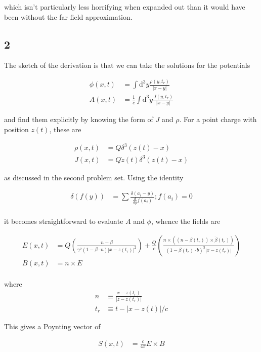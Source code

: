 \documentclass[12pt]{article}
\begin{document}
which isn't particularly less horrifying when expanded out than it would have been without the far field approximation.

\subsection*{2}

The sketch of the derivation is that we can take the solutions for the potentials

\begin{align*}
\phi(x,t) &= \int\mathrm{d}^3y\frac{\rho(y,t_r)}{|x-y|} \\[6pt]
A(x,t) &= \frac{1}{c}\int\mathrm{d}^3y\frac{J(y,t_r)}{|x-y|} 
\end{align*}

and find them explicitly by knowing the form of \(J\) and \(\rho\). For a point charge with position \(z(t)\), these are

\begin{align*}
\rho(x,t) &= Q\delta^3(z(t)-x) \\
J(x,t) &= Q\dot{z}(t)\delta^3(z(t)-x)
\end{align*}

as discussed in the second problem set. Using the identity

\begin{align*}
\delta(f(y)) &= \sum\frac{\delta(a_i-y)}{\frac{d}{dy}f(a_i)};f(a_i) = 0\\  
\end{align*}

it becomes straightforward to evaluate \(A\) and \(\phi\), whence the fields are

\begin{align*}
E(x,t) &= Q\left( \frac{n-\beta}{\gamma^2(1-\beta \cdot n)|x-z(t_r)|^2} \right) +\frac{Q}{c}\left( \frac{n \times( (n-\beta(t_r)) \times \dot{\beta}(t_r))}{(1-\beta(t_r)\cdot b)^3|x-z(t_r)|}\right) \\
%
B(x,t) &= n \times E \\
\end{align*}

where
\begin{align*}
n &\equiv \frac{x-z(t_r)}{|z-z(t_r)|}\\
t_r &\equiv t - |x-z(t)|/c
\end{align*}

This gives a Poynting vector of

\begin{align*}
S(x,t) &= \frac{c}{4\pi}E\times B
\end{align*}
\end{document}
